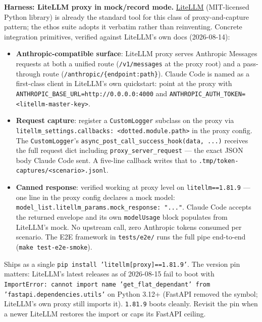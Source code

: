 \documentclass[a4paper,10pt]{article}
\newcommand{\pkg}[1]{\texttt{#1}}
\newcommand{\field}[1]{\texttt{#1}}
\newcommand{\cmd}[1]{\texttt{#1}}
\newcommand{\fpath}[1]{\texttt{#1}}
\begin{document}
\textbf{Harness: LiteLLM proxy in mock/record mode.}
\href{https://github.com/BerriAI/litellm}{LiteLLM} (MIT-licensed
Python library) is already the standard tool for this class of
proxy-and-capture pattern; the ethos suite adopts it verbatim
rather than reinventing.  Concrete integration primitives, verified
against LiteLLM's own docs (2026-08-14):

\begin{itemize}
  \item \textbf{Anthropic-compatible surface}: LiteLLM proxy serves
    Anthropic Messages requests at both a unified route
    (\fpath{/v1/messages} at the proxy root) and a pass-through
    route (\fpath{/anthropic/\{endpoint:path\}}).  Claude Code is
    named as a first-class client in LiteLLM's own quickstart:
    point at the proxy with
    \texttt{ANTHROPIC\_BASE\_URL=http://0.0.0.0:4000} and
    \texttt{ANTHROPIC\_AUTH\_TOKEN=<litellm-master-key>}.

  \item \textbf{Request capture}: register a \pkg{CustomLogger}
    subclass on the proxy via
    \texttt{litellm\_settings.callbacks: <dotted.module.path>} in
    the proxy config.  The \pkg{CustomLogger}'s
    \texttt{async\_post\_call\_success\_hook(data, ...)} receives
    the full request dict including \field{proxy\_server\_request}
    --- the exact JSON body Claude Code sent.  A five-line callback
    writes that to \fpath{.tmp/token-captures/<scenario>.jsonl}.

  \item \textbf{Canned response}: verified working at proxy level
    on \texttt{litellm==1.81.9} --- one line in the proxy config
    declares a mock model:
    \texttt{model\_list.litellm\_params.mock\_response: "..."}.
    Claude Code accepts the returned envelope and its own
    \field{modelUsage} block populates from LiteLLM's mock.  No
    upstream call, zero Anthropic tokens consumed per scenario.
    The E2E framework in \fpath{tests/e2e/} runs the full pipe
    end-to-end (\cmd{make test-e2e-smoke}).
\end{itemize}

Ships as a single \cmd{pip install 'litellm[proxy]==1.81.9'}.  The
version pin matters: LiteLLM's latest releases as of 2026-08-15
fail to boot with
\texttt{ImportError: cannot import name 'get\_flat\_dependant' from
'fastapi.dependencies.utils'} on Python 3.12+ (FastAPI removed the
symbol; LiteLLM's own proxy still imports it).  \texttt{1.81.9}
boots cleanly.  Revisit the pin when a newer LiteLLM restores the
import or caps its FastAPI ceiling.
\end{document}
